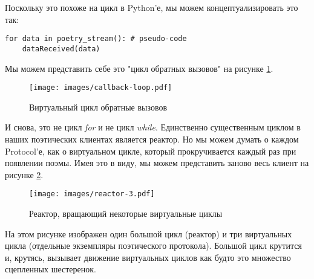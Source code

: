 Поскольку это похоже на цикл в Python'е, 
мы можем концептуализировать это так:

 \begin{verbatim}
for data in poetry_stream(): # pseudo-code
    dataReceived(data)
\end{verbatim} 

Мы можем представить себе это "цикл обратных вызовов" на 
рисунке \ref{fig:callback-loop}.

\begin{figure}[h]
\begin{center}
    \texttt{[image: images/callback-loop.pdf]}
    \caption{Виртуальный цикл обратные вызовов\label{fig:callback-loop}}
\end{center}
\end{figure}


И снова, это не цикл \textit{for} и не цикл \textit{while}. 
Единственно существенным циклом в наших поэтических клиентах 
является реактор. Но мы можем думать о каждом Protocol'е, 
как о виртуальном цикле, который прокручивается каждый раз 
при появлении поэмы. Имея это в виду, мы можем представить 
заново весь клиент на рисунке \ref{fig:reactor-3}. 

\begin{figure}[h]
\begin{center}
    \texttt{[image: images/reactor-3.pdf]}
    \caption{Реактор, вращающий некоторые виртуальные циклы\label{fig:reactor-3}}
\end{center}
\end{figure}


На этом рисунке изображен один большой цикл (реактор) и 
три виртуальных цикла (отдельные экземпляры поэтического протокола). 
Большой цикл крутится и, крутясь, вызывает движение виртуальных 
циклов как будто это множество сцепленных шестеренок.  


